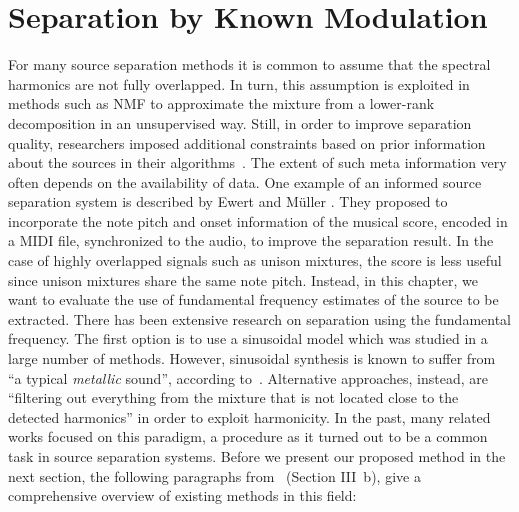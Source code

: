 \chapter{Separation by Known Modulation}
\label{cha:known}

For many source separation methods it is common to assume that the spectral harmonics are not fully overlapped.
In turn, this assumption is exploited in methods such as \ac{NMF} to approximate the mixture from a lower-rank decomposition in an unsupervised way.
Still, in order to improve separation quality, researchers imposed additional constraints based on prior information about the sources in their algorithms~\cite{ozerov12}.
The extent of such meta information very often depends on the availability of data.
One example of an informed source separation system is described by Ewert and M\"uller \cite{ewert12}.
They proposed to incorporate the note pitch and onset information of the musical score, encoded in a MIDI file, synchronized to the audio, to improve the separation result.
In the case of highly overlapped signals such as unison mixtures, the score is less useful since unison mixtures share the same note pitch.
Instead, in this chapter, we want to evaluate the use of fundamental frequency estimates of the source to be extracted.
There has been extensive research on separation using the fundamental frequency.
The first option is to use a sinusoidal model which was studied in a large number of methods.
However, sinusoidal synthesis is known to suffer from ``a typical \textit{metallic} sound'', according to~\cite{rafii}. 
Alternative approaches, instead, are ``filtering out everything from the mixture that is not located close to the detected harmonics'' in order to exploit harmonicity.
In the past, many related works focused on this paradigm, a procedure as it turned out to be a common task in source separation systems. 
Before we present our proposed method in the next section, the following paragraphs from~\cite{rafii} (Section III~b), give a comprehensive overview of existing methods in this field:

